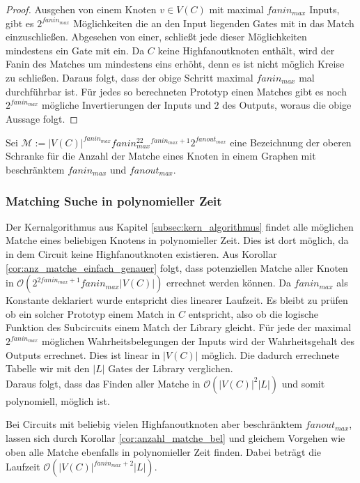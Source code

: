 \documentclass[11pt, a4paper, german]{article}
\begin{document}
\begin{proof}
Ausgehen von einem Knoten $v \in V(C)$ mit maximal $fanin_{max}$ Inputs, gibt es  $2^{fanin_{max}}$ Möglichkeiten die an den Input liegenden Gates mit in das Match einzuschließen. Abgesehen von einer, schließt jede dieser Möglichkeiten mindestens ein Gate mit ein. Da $C$ keine Highfanoutknoten enthält, wird der Fanin des Matches um mindestens eins erhöht, denn es ist nicht möglich Kreise zu schließen. Daraus folgt, dass der obige Schritt maximal $fanin_{max}$ mal durchführbar ist. Für jedes so berechneten Prototyp einen Matches gibt es noch $2^{fanin_{max}}$ mögliche Invertierungen der Inputs und $2$ des Outputs, woraus die obige Aussage folgt.
\end{proof}
\begin{definition}
Sei $\mathcal{M}:= |V(C)|^{fanin_{max}} fanin_{max}^22^{fanin_{max}+1}2^{fanout_{max}}$ eine Bezeichnung der oberen Schranke für die Anzahl der Matche eines Knoten in einem Graphen mit beschränktem $fanin_{max}$ und $fanout_{max}$.
\end{definition}

\subsubsection{Matching Suche in polynomieller Zeit}
Der Kernalgorithmus aus Kapitel \ref{subsec:kern_algorithmus} findet alle möglichen Matche eines beliebigen Knotens in polynomieller Zeit. Dies ist dort möglich, da in dem Circuit keine Highfanoutknoten existieren. Aus Korollar \ref{cor:anz_matche_einfach_genauer} folgt, dass potenziellen Matche aller Knoten  in $\mathcal{O}(2^{2fanin_{max} +1}fanin_{max} |V(C)|)$ errechnet werden können. Da $fanin_{max}$ als Konstante deklariert wurde entspricht dies linearer Laufzeit. Es bleibt zu prüfen ob  ein solcher Prototyp einem Match in $C$ entspricht, also ob die logische Funktion des Subcircuits einem Match der Library gleicht. Für jede der maximal $2^{fanin_{max}}$ möglichen Wahrheitsbelegungen der Inputs wird der Wahrheitsgehalt des Outputs errechnet. Dies ist linear in $|V(C)|$ möglich. Die dadurch errechnete Tabelle wir mit den $|L|$ Gates der Library verglichen. \\
Daraus folgt, dass das Finden aller Matche in $\mathcal{O}(|V(C)|^2|L|)$ und somit polynomiell, möglich ist.

Bei Circuits mit beliebig vielen Highfanoutknoten aber beschränktem $fanout_{max}$, lassen sich durch Korollar \ref{cor:anzahl_matche_bel} und gleichem Vorgehen wie oben alle Matche ebenfalls in polynomieller Zeit finden. Dabei beträgt die Laufzeit $\mathcal{O}(|V(C)|^{fanin_{max}+2}|L|)$.
\end{document}
